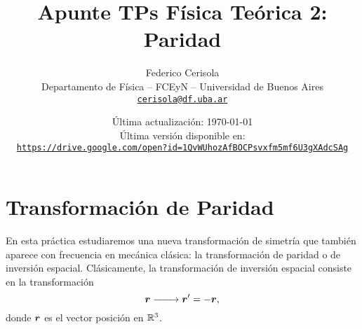 \documentclass[10pt, a4paper]{article}
\numberwithin{equation}{subsection}
\begin{document}
\title{Apunte TPs Física Teórica 2: Paridad}
\author{Federico Cerisola
  \\ \small{Departamento de Física -- FCEyN -- Universidad de Buenos Aires}
  \\ \small{\href{mailto:cerisola@df.uba.ar}{\nolinkurl{cerisola@df.uba.ar}}}
}
\date{\small Última actualización: \today \\[1em]
  Última versión disponible en: \\
  \texttt{
    \href{https://drive.google.com/open?id=1QvWUhozAfBOCPsvxfm5mf6U3gXAdcSAg}
    {https://drive.google.com/open?id=1QvWUhozAfBOCPsvxfm5mf6U3gXAdcSAg}
  }}
\maketitle
\thispagestyle{empty}

\vfill
\doclicenseThis

\pagebreak

\newpage
  \tableofcontents
\newpage

\section{Transformación de Paridad}

En esta práctica estudiaremos una nueva transformación de simetría que también
aparece con frecuencia en mecánica clásica: la transformación de paridad o de
inversión espacial. Clásicamente, la transformación de inversión espacial
consiste en la transformación
\begin{equation} \label{eq:defparityclass}
  \vb*{r} \xrightarrow{\qquad} \vb*{r}' = -\vb*{r},
\end{equation}
donde $\vb*{r}$ es el vector posición en $\mathbb{R}^3$.
\end{document}
